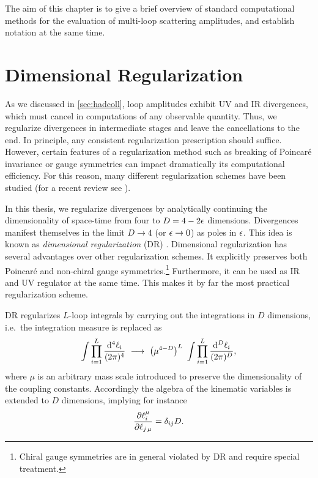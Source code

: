 The aim of this chapter is to give a brief overview of standard computational methods for the
evaluation of multi-loop scattering amplitudes, and establish notation at the same time.

\section{Dimensional Regularization}



As we discussed in \cref{sec:hadcoll}, loop amplitudes exhibit UV and IR divergences,
which must cancel in computations of any observable quantity.
Thus, we regularize divergences in intermediate stages and leave the cancellations to the end. 
In principle, any consistent regularization prescription should suffice.
However, certain features of a regularization method such as breaking of Poincaré invariance or gauge symmetries
can impact dramatically its computational efficiency.
For this reason, many different regularization schemes have been studied (for a recent review see \cite{Gnendiger:2017pys}).

In this thesis, we regularize divergences by analytically continuing the dimensionality of space-time from four to $D = 4 - 2\epsilon$ dimensions.
Divergences manifest themselves in the limit $D\to4$ (or $\epsilon\to0$) as poles in $\epsilon$.
This idea is known as \emph{dimensional regularization} (DR) \cite{tHooft:1972tcz}.
Dimensional regularization has several advantages over other regularization schemes.
It explicitly preserves both Poincaré and non-chiral gauge symmetries.\footnote{Chiral gauge symmetries are in general violated by DR and require special treatment.}
Furthermore, it can be used as IR and UV regulator at the same time.
This makes it by far the most practical regularization scheme.


DR regularizes $L$-loop integrals by carrying out the integrations in $D$ dimensions, i.e.\ the integration measure is replaced as
\begin{equation}
  \int \prod_{i=1}^{L} \frac{\dd[4]{\ell_i}}{(2\pi)^{4}} ~\longrightarrow~ \quantity(\mu^{4-D})^{L}~\int \prod_{i=1}^{L} \frac{\dd[D]{\ell_i}}{(2\pi)^{D}},
  \label{eq:dimregmeasure}
\end{equation}
where $\mu$ is an arbitrary mass scale introduced to preserve the dimensionality of the coupling constants.
Accordingly the algebra of the kinematic variables is extended to $D$ dimensions, implying for instance
\begin{equation}
   \pdv{\ell^\mu_i}{\ell_{j\,\mu}} = \delta_{i j} D.
\end{equation}

